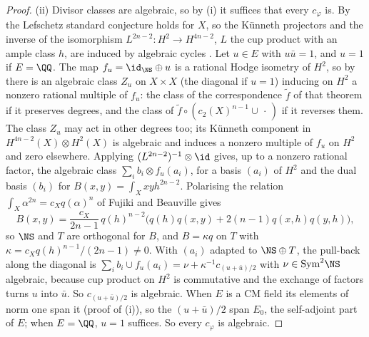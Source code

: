 \begin{proof}
(ii) Divisor classes are algebraic, so by (i) it suffices that every
$c_{\varphi}$ is. By \cite[Theorem~1.1]{CM13} the Lefschetz standard
conjecture holds for $X$, so the K\"unneth projectors and the inverse of the isomorphism
$L^{2n-2}\colon H^{2}\to H^{4n-2}$, $L$ the cup product with an ample class
$h$, are induced by algebraic cycles \cite{Kle68,Kle94}. Let $u\in E$ with
$u\bar u=1$, and $u=1$ if $E=\QQ$. The map $f_{u}=\id_{\NS}\oplus u$ is a
rational Hodge isometry of $H^{2}$, so by \cite[Theorem~1.1]{Mar24} there is
an algebraic class $Z_{u}$ on $X\times X$ (the diagonal if $u=1$) inducing on
$H^{2}$ a nonzero rational multiple of $f_{u}$: the class of the
correspondence $\tilde f$ of that theorem if it preserves degrees, and the
class of $\tilde f\circ(c_{2}(X)^{n-1}\cup\,\cdot\,)$ if it reverses them.
The class $Z_{u}$ may act in other degrees too; its K\"unneth component in
$H^{4n-2}(X)\otimes H^{2}(X)$ is algebraic and induces a nonzero multiple of
$f_{u}$ on $H^{2}$ and zero elsewhere. Applying $(L^{2n-2})^{-1}\otimes\id$
gives, up to a nonzero rational factor, the algebraic class
$\sum_{i}b_{i}\otimes f_{u}(a_{i})$, for a basis $(a_{i})$ of $H^{2}$ and
the dual basis $(b_{i})$ for $B(x,y)=\int_{X}xyh^{2n-2}$. Polarising the
relation $\int_{X}\alpha^{2n}=c_{X}q(\alpha)^{n}$ of Fujiki and Beauville
\cite{Bea83,Fuj87} gives
\[
  B(x,y)=\frac{c_{X}}{2n-1}\,q(h)^{n-2}\bigl(q(h)q(x,y)+2(n-1)q(x,h)q(y,h)\bigr),
\]
so $\NS$ and $T$ are orthogonal for $B$, and $B=\kappa q$ on $T$ with
$\kappa=c_{X}q(h)^{n-1}/(2n-1)\ne0$. With $(a_{i})$ adapted to
$\NS\oplus T$, the pull-back along the diagonal is
$\sum_{i}b_{i}\cup f_{u}(a_{i})=\nu+\kappa^{-1}c_{(u+\bar u)/2}$ with
$\nu\in\mathrm{Sym}^{2}\NS$ algebraic, because cup product on $H^{2}$ is
commutative and the exchange of factors turns $u$ into $\bar u$. So
$c_{(u+\bar u)/2}$ is algebraic. When $E$ is a CM field its elements of norm
one span it (proof of (i)), so the $(u+\bar u)/2$ span
$E_{0}$, the self-adjoint part of $E$; when $E=\QQ$, $u=1$ suffices. So
every $c_{\varphi}$ is algebraic.


\end{proof}
